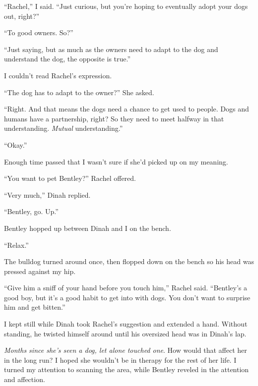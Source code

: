 ``Rachel,'' I said.  ``Just curious, but you're hoping to eventually adopt your dogs out, right?''



``To good owners.  So?''



``Just saying, but as much as the owners need to adapt to the dog and understand the dog, the opposite is true.''



I couldn't read Rachel's expression.



``The dog has to adapt to the owner?'' She asked.



``Right.  And that means the dogs need a chance to get used to people.  Dogs and humans have a partnership, right?  So they need to meet halfway in that understanding.  \emph{Mutual} understanding.''



``Okay.''



Enough time passed that I wasn't sure if she'd picked up on my meaning.



``You want to pet Bentley?'' Rachel offered.



``Very much,'' Dinah replied.



``Bentley, go.  Up.''



Bentley hopped up between Dinah and I on the bench.



``Relax.''



The bulldog turned around once, then flopped down on the bench so his head was pressed against my hip.



``Give him a sniff of your hand before you touch him,'' Rachel said.  ``Bentley's a good boy, but it's a good habit to get into with dogs.  You don't want to surprise him and get bitten.''



I kept still while Dinah took Rachel's suggestion and extended a hand.  Without standing, he twisted himself around until his oversized head was in Dinah's lap.



\emph{Months since she's seen a dog, let alone touched one}.  How would that affect her in the long run?  I hoped she wouldn't be in therapy for the rest of her life.  I turned my attention to scanning the area, while Bentley reveled in the attention and affection.



